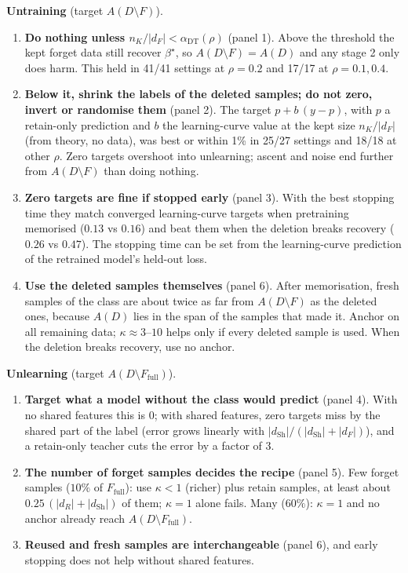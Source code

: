 \documentclass[10pt]{article}
\newcommand{\Ff}{F_{\mathrm{full}}}
\newcommand{\dSh}{d_{\mathrm{Sh}}}
\begin{document}
\textbf{Untraining} (target $A(D\setminus F)$).
\begin{enumerate}\setlength{\itemsep}{1pt}
\item \textbf{Do nothing unless $n_K/|d_F|<\alpha_{\mathrm{DT}}(\rho)$} (panel 1). Above the threshold the kept forget data still recover $\beta^\star$, so $A(D\setminus F)=A(D)$ and any stage 2 only does harm. This held in 41/41 settings at $\rho=0.2$ and 17/17 at $\rho=0.1,0.4$.
\item \textbf{Below it, shrink the labels of the deleted samples; do not zero, invert or randomise them} (panel 2). The target $p+b\,(y-p)$, with $p$ a retain-only prediction and $b$ the learning-curve value at the kept size $n_K/|d_F|$ (from theory, no data), was best or within 1\% in 25/27 settings and 18/18 at other $\rho$. Zero targets overshoot into unlearning; ascent and noise end further from $A(D\setminus F)$ than doing nothing.
\item \textbf{Zero targets are fine if stopped early} (panel 3). With the best stopping time they match converged learning-curve targets when pretraining memorised ($0.13$ vs $0.16$) and beat them when the deletion breaks recovery ($0.26$ vs $0.47$). The stopping time can be set from the learning-curve prediction of the retrained model's held-out loss.
\item \textbf{Use the deleted samples themselves} (panel 6). After memorisation, fresh samples of the class are about twice as far from $A(D\setminus F)$ as the deleted ones, because $A(D)$ lies in the span of the samples that made it. Anchor on all remaining data; $\kappa\approx3$--$10$ helps only if every deleted sample is used. When the deletion breaks recovery, use no anchor.
\end{enumerate}

\textbf{Unlearning} (target $A(D\setminus\Ff)$).
\begin{enumerate}\setlength{\itemsep}{1pt}\setcounter{enumi}{4}
\item \textbf{Target what a model without the class would predict} (panel 4). With no shared features this is $0$; with shared features, zero targets miss by the shared part of the label (error grows linearly with $|\dSh|/(|\dSh|+|d_F|)$), and a retain-only teacher cuts the error by a factor of 3.
\item \textbf{The number of forget samples decides the recipe} (panel 5). Few forget samples ($10\%$ of $\Ff$): use $\kappa<1$ (richer) plus retain samples, at least about $0.25\,(|d_R|+|\dSh|)$ of them; $\kappa=1$ alone fails. Many ($60\%$): $\kappa=1$ and no anchor already reach $A(D\setminus\Ff)$.
\item \textbf{Reused and fresh samples are interchangeable} (panel 6), and early stopping does not help without shared features.
\end{enumerate}
\end{document}
